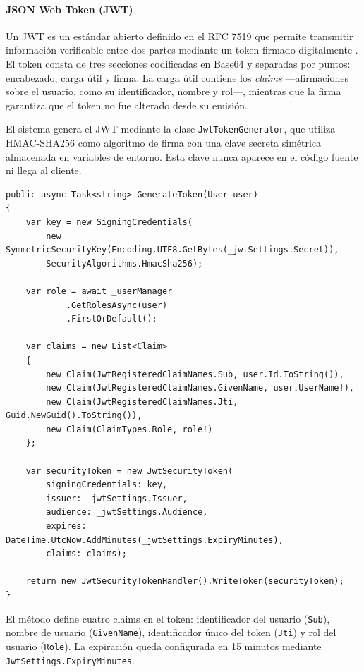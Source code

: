 \paragraph{JSON Web Token (JWT)}

Un JWT es un estándar abierto definido en el RFC 7519 que permite transmitir información verificable entre dos partes mediante un token firmado digitalmente \cite{rfc7519}. El token consta de tres secciones codificadas en Base64 y separadas por puntos: encabezado, carga útil y firma. 
La carga útil contiene los \textit{claims} —afirmaciones sobre el usuario, como su identificador, nombre y rol—, mientras que la firma garantiza que el token no fue alterado desde su emisión.

El sistema genera el JWT mediante la clase \texttt{JwtTokenGenerator}, que utiliza HMAC-SHA256 como algoritmo de firma con una clave secreta simétrica almacenada en variables de entorno. 
Esta clave nunca aparece en el código fuente ni llega al cliente.

\begin{lstlisting}[language={[Sharp]C}, caption={Generación del JWT en JwtTokenGenerator}, label={lst:jwttokengenerator}]
public async Task<string> GenerateToken(User user)
{
    var key = new SigningCredentials(
        new SymmetricSecurityKey(Encoding.UTF8.GetBytes(_jwtSettings.Secret)),
        SecurityAlgorithms.HmacSha256);

    var role = await _userManager
            .GetRolesAsync(user)
            .FirstOrDefault();

    var claims = new List<Claim>
    {
        new Claim(JwtRegisteredClaimNames.Sub, user.Id.ToString()),
        new Claim(JwtRegisteredClaimNames.GivenName, user.UserName!),
        new Claim(JwtRegisteredClaimNames.Jti, Guid.NewGuid().ToString()),
        new Claim(ClaimTypes.Role, role!)
    };

    var securityToken = new JwtSecurityToken(
        signingCredentials: key,
        issuer: _jwtSettings.Issuer,
        audience: _jwtSettings.Audience,
        expires: DateTime.UtcNow.AddMinutes(_jwtSettings.ExpiryMinutes),
        claims: claims);

    return new JwtSecurityTokenHandler().WriteToken(securityToken);
}
\end{lstlisting}

El método define cuatro claims en el token: identificador del usuario (\texttt{Sub}), nombre de usuario (\texttt{GivenName}), identificador único del token (\texttt{Jti}) y rol del usuario (\texttt{Role}). 
La expiración queda configurada en 15 minutos mediante \texttt{JwtSettings.ExpiryMinutes}.

